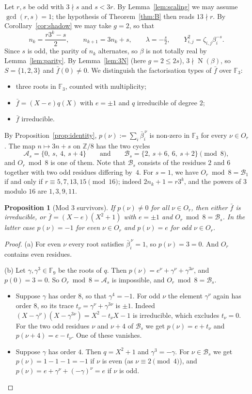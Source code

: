 \documentclass[11pt,a4paper]{article}
\newtheorem{proposition}[theorem]{Proposition}
\theoremstyle{definition}
\theoremstyle{remark}
\newcommand{\Z}{\mathbb{Z}}
\newcommand{\F}{\mathbb{F}}
\DeclareMathOperator{\Nm}{N}
\begin{document}
Let $r,s$ be odd with $3\nmid s$ and $s<3r$.
By Lemma~\ref{lem:scaling} we may assume $\gcd(r,s)=1$; the hypothesis of Theorem~\ref{thm:B} then reads $13\nmid r$.
By Corollary~\ref{cor:shadow} we may take $g=2$, so that
\[
 n_k=\frac{r3^k-s}2,\qquad n_{k+1}=3n_k+s,\qquad\lambda=-\tfrac s2,\qquad Y_{i,j}^2=\zeta_{i,j}\beta_i^{-s}.
\]
Since $s$ is odd, the parity of $n_k$ alternates, so $\beta$ is not totally real by Lemma~\ref{lem:parity}.
By Lemma~\ref{lem:3N} (here $g=2\le2s$), $3\nmid\Nm(\beta)$, so $S=\{1,2,3\}$ and $\bar f(0)\neq0$.
We distinguish the factorisation types of $\bar f$ over $\F_3$:
\begin{itemize}
\item[(a)] three roots in $\F_3$, counted with multiplicity;
\item[(b)] $\bar f=(X-e)q(X)$ with $e=\pm1$ and $q$ irreducible of degree $2$;
\item[(c)] $\bar f$ irreducible.
\end{itemize}
By Proposition~\ref{prop:identity}, $p(\nu):=\sum_i\bar\beta_i^{\,\nu}$ is non-zero in $\F_3$ for every $\nu\in O_r$.
The map $n\mapsto3n+s$ on $\Z/8$ has the two cycles
\[
 \mathcal A_s=\{0,\ s,\ 4,\ s+4\}\qquad\text{and}\qquad\mathcal B_s=\{2,\ s+6,\ 6,\ s+2\}\pmod 8,
\]
and $O_r\bmod8$ is one of them.
Note that $\mathcal B_s$ consists of the residues $2$ and $6$ together with two odd residues differing by~$4$.
For $s=1$, we have $O_r\bmod 8=\mathcal B_1$ if and only if $r\equiv5,7,13,15\pmod{16}$; indeed $2n_k+1=r3^k$, and the powers of $3$ modulo $16$ are $1,3,9,11$.

\begin{proposition}[Mod $3$ survivors]\label{prop:mod3types}
If $p(\nu)\ne0$ for all $\nu\in O_r$, then either $\bar f$ is irreducible, or $\bar f=(X-e)(X^2+1)$ with $e=\pm1$ and $O_r\bmod8=\mathcal B_s$.
In the latter case $p(\nu)=-1$ for even $\nu\in O_r$ and $p(\nu)=e$ for odd $\nu\in O_r$.
\end{proposition}
\begin{proof}
(a) For even $\nu$ every root satisfies $\bar\beta_i^{\,\nu}=1$, so $p(\nu)=3=0$. And $O_r$ contains even residues.

(b) Let $\gamma,\gamma^3\in\F_9$ be the roots of $q$. Then $p(\nu)=e^{\nu}+\gamma^\nu+\gamma^{3\nu}$, and $p(0)=3=0$. So $O_r\bmod8=\mathcal A_s$ is impossible, and $O_r\bmod 8=\mathcal B_s$.
\begin{itemize}
\item Suppose $\gamma$ has order $8$, so that $\gamma^4=-1$. For odd $\nu$ the element $\gamma^\nu$ again has order $8$, so its trace $t_\nu=\gamma^\nu+\gamma^{3\nu}$ is $\pm1$. Indeed $(X-\gamma^\nu)(X-\gamma^{3\nu})=X^2-t_\nu X-1$ is irreducible, which excludes $t_\nu=0$.
For the two odd residues $\nu$ and $\nu+4$ of $\mathcal B_s$ we get $p(\nu)=e+t_\nu$ and $p(\nu+4)=e-t_\nu$. One of these vanishes.
\item Suppose $\gamma$ has order $4$. Then $q=X^2+1$ and $\gamma^3=-\gamma$. For $\nu\in\mathcal B_s$ we get $p(\nu)=1-1-1=-1$ if $\nu$ is even (as $\nu\equiv2\pmod4$), and $p(\nu)=e+\gamma^\nu+(-\gamma)^\nu=e$ if $\nu$ is odd.\qedhere
\end{itemize}
\end{proof}
\end{document}
